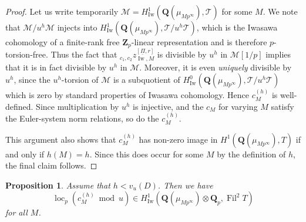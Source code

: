 \documentclass[cjm]{ipart}
\theoremstyle{plain}
\newtheorem{proposition}[theorem]{Proposition}
\theoremstyle{remark}
\DeclareMathOperator{\Fil}{Fil}
\DeclareMathOperator{\Iw}{Iw}
\DeclareMathOperator{\loc}{loc}
\newcommand{\QQ}{\mathbf{Q}}
\newcommand{\Qp}{\QQ_p}
\newcommand{\Zp}{\mathbf{Z}_p}
\newcommand{\cM}{\mathcal{M}}
\newcommand{\cT}{\mathcal{T}}
\newcommand{\uPi}{\underline{\Pi}}
\numberwithin{equation}{subsection}
\begin{document}
  \begin{proof}
   Let us write temporarily $\cM = H^1_{\Iw}(\QQ(\mu_{Mp^\infty}), \cT)$ for some $M$. We note that $\cM/ u^h \cM$ injects into $H^1_{\Iw}(\QQ(\mu_{Mp^\infty}), \cT/u^h \cT)$, which is the Iwasawa cohomology of a finite-rank free $\Zp$-linear representation and is therefore $p$-torsion-free. Thus the fact that ${}_{c_1, c_2} z^{[\uPi, r]}_{\Iw, M}$ is divisible by $u^h$ in $\cM[1/p]$ implies that it is in fact divisible by $u^h$ in $\cM$. Moreover, it is even \emph{uniquely} divisible by $u^h$, since the $u^h$-torsion of $\cM$ is a subquotient of $H^0_{\Iw}(\QQ(\mu_{Mp^\infty}), \cT/u^h\cT)$ which is zero by standard properties of Iwasawa cohomology. Hence $c_M^{(h)}$ is well-defined. Since multiplication by $u^h$ is injective, and the $c_M$ for varying $M$ satisfy the Euler-system norm relations, so do the $c_M^{(h)}$.

   This argument also shows that $c_M^{(h)}$ has non-zero image in $H^1(\QQ(\mu_{Mp^\infty}), T)$ if and only if $h(M) = h$. Since this does occur for some $M$ by the definition of $h$, the final claim follows.
  \end{proof}

  \begin{proposition}
   Assume that $h < v_u(D)$. Then we have
   \[ \loc_p(c_M^{(h)} \bmod u) \in H^1_{\Iw}(\QQ(\mu_{M p^\infty}) \otimes \Qp, \Fil^2 T)\]
   for all $M$.
  \end{proposition}
\end{document}
